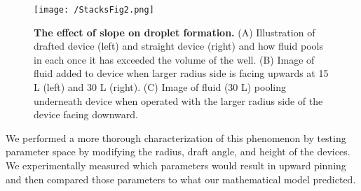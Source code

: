 \begin{figure}[h!] %
\centering
\texttt{[image: /StacksFig2.png]}
\caption[\textbf{The effect of slope on droplet formation}]{\textbf{The effect of slope on droplet formation.} (A) Illustration of drafted device (left) and straight device (right) and how fluid pools in each once it has exceeded the volume of the well. (B) Image of fluid added to device when larger radius side is facing upwards at 15 \textmu L (left) and 30 \textmu L (right). (C) Image of fluid (30 \textmu L) pooling underneath device when operated with the larger radius side of the device facing downward.}
\label{figure:StacksFig2}
\end{figure}


We performed a more thorough characterization of this phenomenon by testing parameter space by modifying the radius, draft angle, and height of the devices. We experimentally measured which parameters would result in upward pinning and then compared those parameters to what our mathematical model predicted. 


